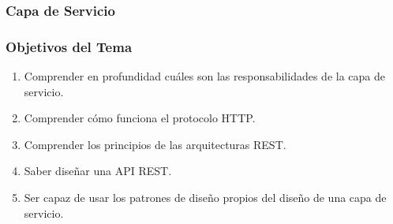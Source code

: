 \documentclass[a4paper,slidestop,xcolor=pst,blue]{beamer}
\begin{document}
\begin{frame}[t]
    \frametitle{Capa de Servicio}
\end{frame}

\begin{frame}[c]
    \frametitle{Objetivos del Tema}
    \begin{enumerate}[<+->]
         \item Comprender en profundidad cuáles son las responsabilidades de la capa de servicio.
         \item Comprender cómo funciona el protocolo HTTP.
         \item Comprender los principios de las arquitecturas REST.
         \item Saber diseñar una API REST.
         \item Ser capaz de usar los patrones de diseño propios del diseño de una capa de servicio.
    \end{enumerate}
\end{frame}
\end{document}
